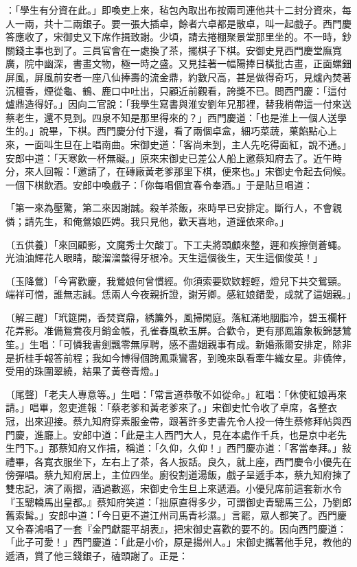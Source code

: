 ：「學生有分資在此。」即喚吏上來，毡包內取出布按兩司連他共十二封分資來，每人一兩，共十二兩銀子。要一張大插卓，餘者六卓都是散卓，叫一起戲子。西門慶答應收了，宋御史又下席作揖致謝。少頃，請去捲棚聚景堂那里坐的。不一時，鈔關錢主事也到了。三員官會在一處換了茶，擺棋子下棋。安御史見西門慶堂廡寬廣，院中幽深，書畫文物，極一時之盛。又見挂著一幅陽捧日橫批古畫，正面螺鈿屏風，屏風前安者一座八仙捧壽的流金鼎，約數尺高，甚是做得奇巧，見爐內焚著沉檀香，煙從龜、鶴、鹿口中吐出，只顧近前觀看，誇獎不已。問西門慶：「這付爐鼎造得好。」因向二官說：「我學生寫書與淮安劉年兄那裡，替我梢帶這一付來送蔡老生，還不見到。四泉不知是那里得來的？」西門慶道：「也是淮上一個人送學生的。」說畢，下棋。西門慶分付下邊，看了兩個卓盒，細巧菜蔬，菓餡點心上來，一面叫生旦在上唱南曲。宋御史道：「客尚未到，主人先吃得面紅，說不通。」安郎中道：「天寒飲一杯無礙。」原來宋御史已差公人船上邀蔡知府去了。近午時分，來人回報：「邀請了，在磚廠黃老爹那里下棋，便來也。」宋御史令起去伺候。一個下棋飲酒。安郎中喚戲子：「你每唱個宜春令奉酒。」于是貼旦唱道：

「第一來為壓驚，第二來因謝誠。殺羊茶飯，來時早已安排定。斷行人，不會親僯；請先生，和俺鶯娘匹娉。我只見他，歡天喜地，道謹依來命。」

〔五供養〕「來回顧影，文魔秀士欠酸丁。下工夫將頭顱來整，遲和疾擦倒蒼蠅。光油油輝花人眼睛，酸溜溜螫得牙根冷。天生這個後生，天生這個俊英！」

〔玉降鶯〕「今宵歡慶，我鶯娘何曾慣經。你須索要欵欵輕輕，燈兒下共交鴛頸。端祥可憎，誰無志誠。恁兩人今夜親折證，謝芳卿。感紅娘錯愛，成就了這姻親。」

〔解三醒〕「玳筵開，香焚寶鼎，綉簾外，風掃閑庭。落紅滿地胭脂冷，碧玉欄杆花弄影。准備鴛鴦夜月銷金帳，孔雀春風軟玉屏。合歡令，更有那鳳簫象板錦瑟鷥笙。」生唱：「可憐我書劍飄零無厚聘，感不盡姻親事有成。新婚燕爾安排定，除非是折桂手報答前程；我如今博得個跨鳳乘鸞客，到晚來臥看牽牛織女星。非僥倖，受用的珠圍翠繞，結果了黃卷青燈。」

〔尾聲〕「老夫人專意等。」生唱：「常言道恭敬不如從命。」紅唱：「休使紅娘再來請。」唱畢，忽吏進報：「蔡老爹和黃老爹來了。」宋御史忙令收了卓席，各整衣冠，出來迎接。蔡九知府穿素服金帶，跟著許多吏書先令人投一侍生蔡修拜帖與西門慶，進廳上。安郎中道：「此是主人西門大人，見在本處作千兵，也是京中老先生門下。」那蔡知府又作揖，稱道：「久仰，久仰！」西門慶亦道：「客當奉拜。」敍禮畢，各寬衣服坐下，左右上了茶，各人扳話。良久，就上座，西門慶令小優先在傍彈唱。蔡九知府居上，主位四坐。廚役割道湯飯，戲子呈遞手本，蔡九知府揀了雙忠記，演了兩摺，酒過數巡，宋御史令生旦上來遞酒。小優兒席前這套新水令『玉驄轎馬出皇都。』蔡知府笑道：「拙原直得多少，可謂御史青驄馬三公，乃劉郎舊索髯。」安郎中道：「今日更不道江州司馬青衫濕。」言罷，眾人都笑了。西門慶又令春鴻唱了一套『金門獻罷平胡表』，把宋御史喜歡的要不的。因向西門慶道：「此子可愛！」西門慶道：「此是小价，原是揚州人。」宋御史攜著他手兒，教他的遞酒，賞了他三錢銀子，磕頭謝了。正是：

